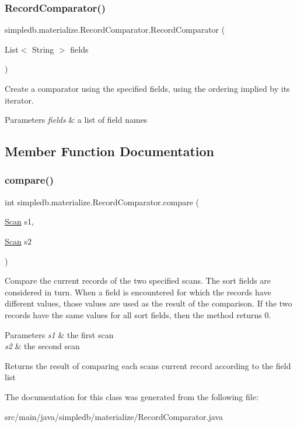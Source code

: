 \subsubsection{\texorpdfstring{Record\+Comparator()}{RecordComparator()}}
{\footnotesize\ttfamily simpledb.\+materialize.\+Record\+Comparator.\+Record\+Comparator (\begin{DoxyParamCaption}\item[{List$<$ String $>$}]{fields }\end{DoxyParamCaption})\hspace{0.3cm}{\ttfamily [inline]}}

Create a comparator using the specified fields, using the ordering implied by its iterator. 
\begin{DoxyParams}{Parameters}
{\em fields} & a list of field names \\
\hline
\end{DoxyParams}


\subsection{Member Function Documentation}
\mbox{\label{classsimpledb_1_1materialize_1_1RecordComparator_a014bbee593c4642fb40d5debfb767da7}} 
\subsubsection{\texorpdfstring{compare()}{compare()}}
{\footnotesize\ttfamily int simpledb.\+materialize.\+Record\+Comparator.\+compare (\begin{DoxyParamCaption}\item[{\hyperlink{interfacesimpledb_1_1query_1_1Scan}{Scan}}]{s1,  }\item[{\hyperlink{interfacesimpledb_1_1query_1_1Scan}{Scan}}]{s2 }\end{DoxyParamCaption})\hspace{0.3cm}{\ttfamily [inline]}}

Compare the current records of the two specified scans. The sort fields are considered in turn. When a field is encountered for which the records have different values, those values are used as the result of the comparison. If the two records have the same values for all sort fields, then the method returns 0. 
\begin{DoxyParams}{Parameters}
{\em s1} & the first scan \\
\hline
{\em s2} & the second scan \\
\hline
\end{DoxyParams}
\begin{DoxyReturn}{Returns}
the result of comparing each scan\textquotesingle{}s current record according to the field list 
\end{DoxyReturn}


The documentation for this class was generated from the following file\+:\begin{DoxyCompactItemize}
\item 
src/main/java/simpledb/materialize/Record\+Comparator.\+java\end{DoxyCompactItemize}
